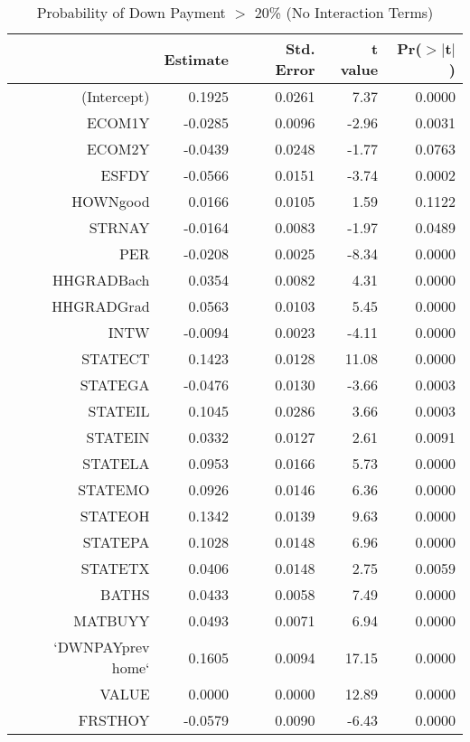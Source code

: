 \begin{table}[ht]
\centering
\begin{tabular}{rrrrr}
  \hline
 & Estimate & Std. Error & t value & Pr($>$$|$t$|$) \\ 
  \hline
(Intercept) & 0.1925 & 0.0261 & 7.37 & 0.0000 \\ 
  ECOM1Y & -0.0285 & 0.0096 & -2.96 & 0.0031 \\ 
  ECOM2Y & -0.0439 & 0.0248 & -1.77 & 0.0763 \\ 
  ESFDY & -0.0566 & 0.0151 & -3.74 & 0.0002 \\ 
  HOWNgood & 0.0166 & 0.0105 & 1.59 & 0.1122 \\ 
  STRNAY & -0.0164 & 0.0083 & -1.97 & 0.0489 \\ 
  PER & -0.0208 & 0.0025 & -8.34 & 0.0000 \\ 
  HHGRADBach & 0.0354 & 0.0082 & 4.31 & 0.0000 \\ 
  HHGRADGrad & 0.0563 & 0.0103 & 5.45 & 0.0000 \\ 
  INTW & -0.0094 & 0.0023 & -4.11 & 0.0000 \\ 
  STATECT & 0.1423 & 0.0128 & 11.08 & 0.0000 \\ 
  STATEGA & -0.0476 & 0.0130 & -3.66 & 0.0003 \\ 
  STATEIL & 0.1045 & 0.0286 & 3.66 & 0.0003 \\ 
  STATEIN & 0.0332 & 0.0127 & 2.61 & 0.0091 \\ 
  STATELA & 0.0953 & 0.0166 & 5.73 & 0.0000 \\ 
  STATEMO & 0.0926 & 0.0146 & 6.36 & 0.0000 \\ 
  STATEOH & 0.1342 & 0.0139 & 9.63 & 0.0000 \\ 
  STATEPA & 0.1028 & 0.0148 & 6.96 & 0.0000 \\ 
  STATETX & 0.0406 & 0.0148 & 2.75 & 0.0059 \\ 
  BATHS & 0.0433 & 0.0058 & 7.49 & 0.0000 \\ 
  MATBUYY & 0.0493 & 0.0071 & 6.94 & 0.0000 \\ 
  `DWNPAYprev home` & 0.1605 & 0.0094 & 17.15 & 0.0000 \\ 
  VALUE & 0.0000 & 0.0000 & 12.89 & 0.0000 \\ 
  FRSTHOY & -0.0579 & 0.0090 & -6.43 & 0.0000 \\ 
   \hline
\end{tabular}
\caption{Probability of Down Payment $>$ 20\% (No Interaction Terms)} 
\label{tab:reg3_fdr}
\end{table}
